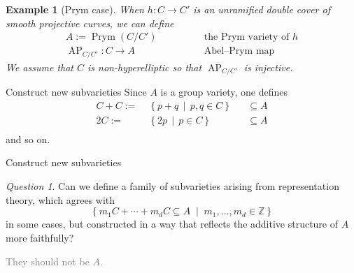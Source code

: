 \documentclass[pdf]{beamer}
\numberwithin{equation}{section}
\theoremstyle{plain}
\newtheorem{eg}[theorem]{Example}
\theoremstyle{plain}
\theoremstyle{remark}
\newtheorem{remark}[theorem]{Remark}
\newtheorem{question}[theorem]{Question}
\newcommand*{\ignore}[1]{\textcolor{gray}{#1}}
\DeclareMathOperator{\Prym}{\operatorname{Prym}}
\DeclareMathOperator{\AP}{\operatorname{AP}}
\begin{document}
\begin{frame}[fragile]
\begin{overlayarea}{\textwidth}{8cm}
{
\begin{eg}[Prym case]
When $h:C \longrightarrow C'$ is an unramified double cover of smooth projective curves, we can define
\begin{equation*}
\begin{aligned}
 A:=\Prym(C/C') &\qquad\qquad \text{the Prym variety of $h$}  \\ 
 \AP_{C/C'}:C \longrightarrow A &\qquad\qquad \text{Abel--Prym map}
\end{aligned}
\end{equation*}
We assume that $C$ is non-hyperelliptic so that $\AP_{C/C'}$ is injective.
\end{eg}
}
\end{overlayarea}
\end{frame}


\begin{frame}[fragile]{Construct new subvarieties}
Since $A$ is a group variety, one defines
\begin{equation*}
\begin{aligned}
  C+C:=\;& \left\{ p+q \,\middle|\, p,q \in C  \right\} &&\subseteq A  \\ 
  2C:=\;& \left\{ 2p \,\middle|\, p \in C  \right\} &&\subseteq A  \\ 
\end{aligned}
\end{equation*}
and so on.
\end{frame}

\begin{frame}[fragile]{Construct new subvarieties}
\begin{question}
Can we define a family of subvarieties arising from representation theory, which agrees with
$$\left\{ m_1C+ \cdots + m_dC \subseteq A  \;\middle|\; m_1,\ldots,m_d \in \mathbb{Z} \right\}$$
in some cases, 
but constructed in a way that reflects the additive structure of $A$ more faithfully?

\ignore{They should not be $A$.}
\end{question}
\end{frame}
\end{document}
